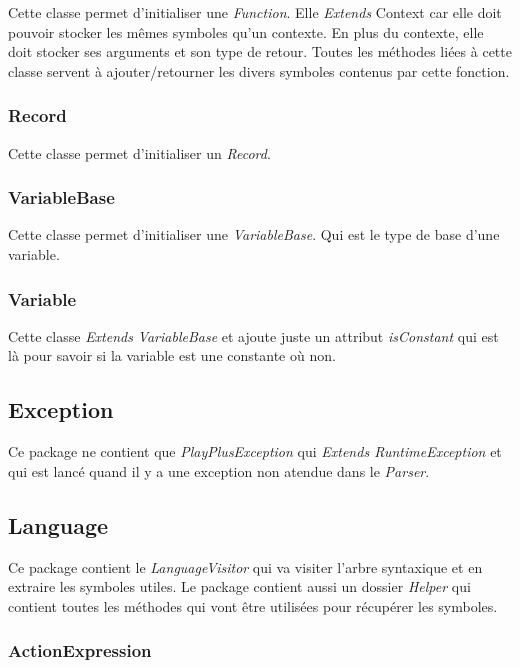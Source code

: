 Cette classe permet d'initialiser une \emph{Function}. Elle \emph{Extends} Context car elle doit pouvoir stocker les mêmes symboles qu'un contexte. En plus du contexte, elle doit stocker ses arguments et son type de retour.
Toutes les méthodes liées à cette classe servent à ajouter/retourner les divers symboles contenus par cette fonction.

\subsubsection{Record}

Cette classe permet d'initialiser un \emph{Record}.

\subsubsection{VariableBase}

Cette classe permet d'initialiser une \emph{VariableBase}. Qui est le type de base d'une variable.

\subsubsection{Variable}

Cette classe \emph{Extends} \emph{VariableBase} et ajoute juste un attribut \emph{isConstant} qui est là pour savoir si la variable est une constante où non.

\subsection{Exception}

Ce package ne contient que \emph{PlayPlusException} qui \emph{Extends RuntimeException} et qui est lancé quand il y a une exception non atendue dans le \emph{Parser}.

\subsection{Language}

Ce package contient le \emph{LanguageVisitor} qui va visiter l'arbre syntaxique et en extraire les symboles utiles. Le package contient aussi un dossier \emph{Helper} qui contient toutes les méthodes qui vont
être utilisées pour récupérer les symboles.

\subsubsection{ActionExpression}

